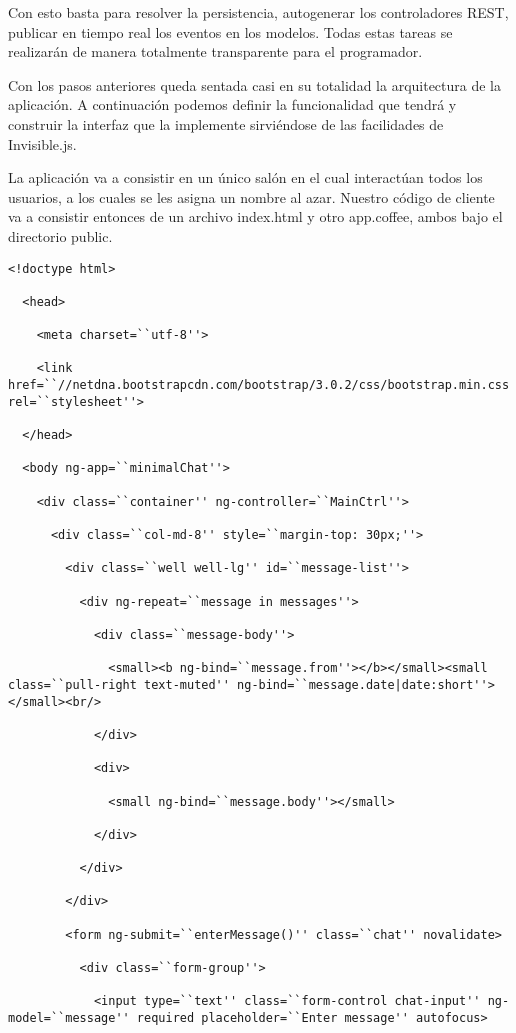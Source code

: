 \documentclass[doc,helv,longtable]{article}
\begin{document}
Con esto basta para resolver la persistencia, autogenerar los controladores REST, publicar en tiempo real los eventos en los modelos. Todas estas tareas se realizarán de manera totalmente transparente para el programador. 

Con los pasos anteriores queda sentada casi en su totalidad la arquitectura de la aplicación. A continuación podemos definir la funcionalidad que tendrá y construir la interfaz que la implemente sirviéndose de las facilidades de Invisible.js.

La aplicación va a consistir en un único salón en el cual interactúan todos los usuarios, a los cuales se les asigna un nombre al azar. Nuestro código de cliente va a consistir entonces de un archivo index.html y otro app.coffee, ambos bajo el directorio public.

\begin{verbatim}
<!doctype html>

  <head>

    <meta charset=``utf-8''>

    <link href=``//netdna.bootstrapcdn.com/bootstrap/3.0.2/css/bootstrap.min.css'' rel=``stylesheet''>

  </head>

  <body ng-app=``minimalChat''>

    <div class=``container'' ng-controller=``MainCtrl''>

      <div class=``col-md-8'' style=``margin-top: 30px;''>

        <div class=``well well-lg'' id=``message-list''> 

          <div ng-repeat=``message in messages''>

            <div class=``message-body''>

              <small><b ng-bind=``message.from''></b></small><small class=``pull-right text-muted'' ng-bind=``message.date|date:short''></small><br/>

            </div>

            <div>

              <small ng-bind=``message.body''></small>

            </div>

          </div>

        </div>

        <form ng-submit=``enterMessage()'' class=``chat'' novalidate>

          <div class=``form-group''>

            <input type=``text'' class=``form-control chat-input'' ng-model=``message'' required placeholder=``Enter message'' autofocus>


\end{verbatim}
\end{document}
